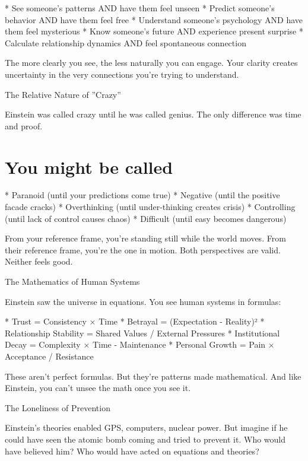\documentclass[12pt,oneside]{book}
\begin{document}
                    * See someone's patterns AND have them feel unseen
                    * Predict someone's behavior AND have them feel free
                    * Understand someone's psychology AND have them feel mysterious
                    * Know someone's future AND experience present surprise
                    * Calculate relationship dynamics AND feel spontaneous connection

The more clearly you see, the less naturally you can engage. Your clarity creates uncertainty in the very connections you're trying to understand.

The Relative Nature of ''Crazy''

Einstein was called crazy until he was called genius. The only difference was time and proof.

\section{You might be called}

                    * Paranoid (until your predictions come true)
                    * Negative (until the positive facade cracks)
                    * Overthinking (until under-thinking creates crisis)
                    * Controlling (until lack of control causes chaos)
                    * Difficult (until easy becomes dangerous)

From your reference frame, you're standing still while the world moves. From their reference frame, you're the one in motion. Both perspectives are valid. Neither feels good.

The Mathematics of Human Systems

Einstein saw the universe in equations. You see human systems in formulas:

                    * Trust = Consistency × Time
                    * Betrayal = (Expectation - Reality)²
                    * Relationship Stability = Shared Values / External Pressures
                    * Institutional Decay = Complexity × Time - Maintenance
                    * Personal Growth = Pain × Acceptance / Resistance

These aren't perfect formulas. But they're patterns made mathematical. And like Einstein, you can't unsee the math once you see it.

The Loneliness of Prevention

Einstein's theories enabled GPS, computers, nuclear power. But imagine if he could have seen the atomic bomb coming and tried to prevent it. Who would have believed him? Who would have acted on equations and theories?
\end{document}
